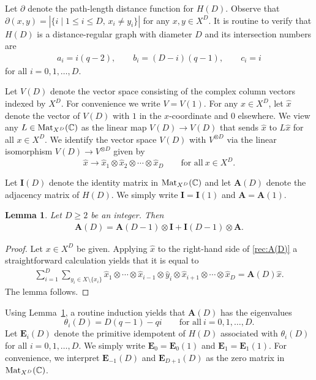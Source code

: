 \documentclass[pdftex]{sigma}%
\def\A{\mathbf A}
\def\E{\mathbf E}
\def\C{\mathbb C}
\def\I{\mathbf I}
\def\Mat{{\rm Mat}}
\numberwithin{equation}{section}
\newtheorem{Lemma}[Theorem]{Lemma}
\begin{document}
Let $\partial$ denote the path-length distance function for $H(D)$. Observe that $\partial(x,y)=|\{i\mid 1\leq i\leq D,\, x_i\not=y_i\}|$ for any $x,y\in X^D$.
It is routine to verify that $H(D)$ is a distance-regular graph with diameter $D$ and its intersection numbers are
\begin{gather*}
a_i=i(q-2),\qquad
b_i=(D-i)(q-1),\qquad
c_i=i
\end{gather*}
for all $i=0,1,\dots,D$.

Let $V(D)$ denote the vector space consisting of the complex column vectors indexed by $X^D$. For convenience we write $V = V (1)$. For any $x\in X^D$, let $\hat{x}$ denote the vector of $V(D)$ with $1$ in the $x$-coordinate and $0$ elsewhere. We view any $L\in \Mat_{X^D}(\C)$ as the linear map $V(D)\to V(D)$ that sends $\hat{x}$ to $L\hat{x}$ for all $x\in X^D$. We identify the vector space $V (D)$ with $V ^{\otimes D}$ via the linear isomorphism $V (D) \to V^{\otimes D}$ given by
\[
\hat{x}\to \hat{x}_1 \otimes \hat{x}_2\otimes \cdots \otimes \hat{x}_D\qquad
\text{for all}\ x\in X^D.
\]

Let $\I(D)$ denote the identity matrix in $\Mat_{X^D}(\C)$ and let $\A(D)$ denote the adjacency matrix of $H(D)$. We simply write $\I=\I(1)$ and $\A=\A(1)$.

\begin{Lemma}\label{lem:A(D)}
Let $D\geq 2$ be an integer. Then
\begin{gather}\label{rec:A(D)}
\A(D)=\A(D-1)\otimes \I+\I(D-1)\otimes \A.
\end{gather}
\end{Lemma}
\begin{proof}
Let $x\in X^D$ be given. Applying $\hat x$ to the right-hand side of \eqref{rec:A(D)} a straightforward calculation yields that it is equal to
\begin{align*}
\sum_{i=1}^{D}
\sum_{y_i\in X\setminus\{x_i\}}
\hat x_1\otimes \cdots \otimes \hat x_{i-1}
\otimes \hat y_i\otimes \hat x_{i+1}
\otimes \cdots \otimes \hat x_D=\A(D)\hat x.
\end{align*}
The lemma follows.
\end{proof}

Using Lemma~\ref{lem:A(D)}, a routine induction yields that $\A(D)$ has the eigenvalues
\[
\theta_i(D)=D(q-1)-qi\qquad
\text{for all} \ i=0,1,\dots,D.
\]
Let $\E_i(D)$ denote the primitive idempotent of $H(D)$ associated with $\theta_i(D)$ for all $i=0,1,\dots,D$. We simply write $\E_0=\E_0(1)$ and $\E_1=\E_1(1)$. For convenience, we interpret $\E_{-1}(D)$ and $\E_{D+1}(D)$ as the zero matrix in $\Mat_{X^D}(\C)$.
\end{document}
